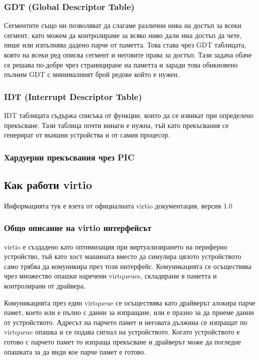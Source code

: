 \subsubsection{GDT (Global Descriptor Table)} \label{gdt}
Сегментите също ни позволяват да слагаме различни нива на достъп за всеки сегмент, като можем да контролираме за всяко ниво дали има достъп да чете, пише или изпълнява дадено парче от паметта. Това става чрез GDT таблицата, която на всеки ред описва сегмент и неговите права за достъп. Тази задача обаче се решава по-добре чрез странициране на паметта и заради това обикновено пълним GDT с минималният брой редове който е нужен.

\subsubsection{IDT (Interrupt Descriptor Table)} \label{idt}
IDT таблицата съдържа списъка от функции, които да се извикат при определено прекъсване. Тази таблица почти винаги е нужна, тъй като прекъсвания се генерират от външни устройства и от самия процесор.

\subsubsection{Хардуерни прекъсвания чрез PIC} \label{pic}

\subsection{Как работи virtio}
Информацията тук е взета от официалната virtio документация, версия 1.0\parencite{virtiodocs}
\subsubsection{Общо описание на virtio интерфейсът}
virtio е създадено като оптимизация при виртуализирането на периферно устройство, тъй като хост машината вместо да симулира цялото устройството само трябва да комуникира през този интерфейс. Комуникацията се осъществява чрез множество опашки наречени virtqueues, складирани в паметта и контролирани от драйвера.

Комуникацията през един virtqueue се осъществява като драйверът алокира парче памет, което или е пълно с данни за изпращане, или е празно за да приеме данни от устройството. Адресът на парчето памет и неговата дължина се изпращат по virtqueue опашка и се подава сигнал на устройството. Когато устройството е готово с парчето памет то изпраща прекъсване и драйверът може да погледне опашката за да види кое парче памет е готово.

